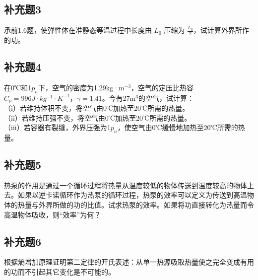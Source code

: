 \newpage
\subsection{补充题3}
承前1.6题，使弹性体在准静态等温过程中长度由 $L_0$ 压缩为 $\frac{L_0}{2}$，试计算外界所作的功。

\newpage
\subsection{补充题4}
在0℃和1$p_n$下，空气的密度为1.29kg·m$^{-3}$，空气的定压比热容 $C_p = 996J·kg^{-1}·K^{-1}$，$\gamma=1.41$。今有27m$^3$的空气，试计算：\\
（i）若维持体积不变，将空气由0℃加热至20℃所需的热量。\\
（ii）若维持压强不变，将空气由0℃加热至20℃所需的热量。\\
（iii）若容器有裂缝，外界压强为1$p_n$，使空气由0℃缓慢地加热至20℃所需的热量。

\newpage
\subsection{补充题5}
热泵的作用是通过一个循环过程将热量从温度较低的物体传送到温度较高的物体上去。如果以逆卡诺循环作为热泵的循环过程，热泵的效率可以定义为传送到高温物体的热量与外界所做的功的比值。试求热泵的效率。如果将功直接转化为热量而令高温物体吸收，则“效率”为何？

\newpage
\subsection{补充题6}
根据熵增加原理证明第二定律的开氏表述：从单一热源吸取热量使之完全变成有用的功而不引起其它变化是不可能的。

